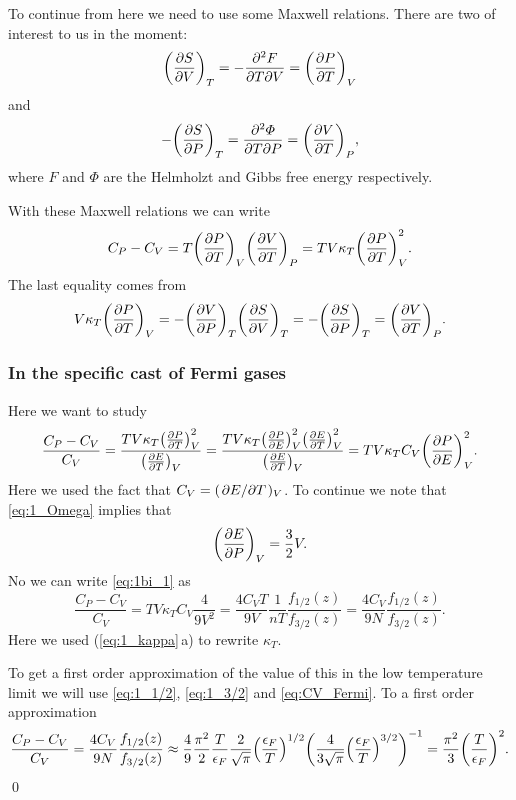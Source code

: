 \documentclass[11pt,letter, swedish, english
]{article}
\begin{document}
To continue from here we need to use some Maxwell relations. There are
two of interest to us in the moment:
\begin{equation}
\qty(\pdv{S}{V})_T=-\pdv[2]{F}{T}{V}=\qty(\pdv{P}{T})_V
\end{equation}
and
\begin{equation}
-\qty(\pdv{S}{P})_T=\pdv[2]{\varPhi}{T}{P}=\qty(\pdv{V}{T})_P,
\end{equation}
where $F$ and $\varPhi$ are the Helmholzt and Gibbs free energy
respectively. 

With these Maxwell relations we can write
\begin{equation}
C_P-C_V=T\qty(\pdv{P}{T})_V\qty(\pdv{V}{T})_P
=TV\kappa_T\qty(\pdv{P}{T})_V^2.
\end{equation}
The last equality comes from
\begin{equation}
V\kappa_T\qty(\pdv{P}{T})_V=-\qty(\pdv{V}{P})_T\qty(\pdv{S}{V})_T
=-\qty(\pdv{S}{P})_T=\qty(\pdv{V}{T})_P.
\end{equation}

\subsubsection{In the specific cast of Fermi gases}
Here we want to study 
\begin{equation}\label{eq:1bi_1}
\frac{C_P-C_V}{C_V} 
= \frac{TV\kappa_T\qty(\pdv{P}{T})_V^2}{\qty(\pdv{E}{T})_V}
= \frac{TV\kappa_T\qty(\pdv{P}{E})_V^2\qty(\pdv{E}{T})_V^2}{\qty(\pdv{E}{T})_V}
= TV\kappa_TC_V\qty(\pdv{P}{E})_V^2.
\end{equation}
Here we used the fact that $C_V=(\pdv*{E}{T})_V$. To continue we
note that \eqref{eq:1_Omega} implies that
\begin{equation}
\qty(\pdv{E}{P})_V=\frac{3}{2}V.
\end{equation}
No we can write \eqref{eq:1bi_1} as
\begin{equation}
\frac{C_P-C_V}{C_V} 
= TV\kappa_TC_V\frac{4}{9V^2}
=\frac{4C_VT}{9V}\frac{1}{nT}\frac{f_{1/2}(z)}{f_{3/2}(z)}
=\frac{4C_V}{9N}\frac{f_{1/2}(z)}{f_{3/2}(z)}.
\end{equation}
Here we used (\ref{eq:1_kappa}\,a) to rewrite $\kappa_T$.

To get a first order approximation of the value of this in the low
temperature limit we will use \eqref{eq:1_1/2}, \eqref{eq:1_3/2} and
\eqref{eq:CV_Fermi}. To a first order approximation 
\begin{equation}
\frac{C_P-C_V}{C_V} =\frac{4C_V}{9N}\frac{f_{1/2}(z)}{f_{3/2}(z)} 
\approx \frac{4}{9} \frac{\pi^2}{2}\frac{T}{\epsilon_F}
\frac{2}{\sqrt{\pi}}\qty(\frac{\epsilon_F}{T})^{1/2}
\qty(\frac{4}{3\sqrt{\pi}}\qty(\frac{\epsilon_F}{T})^{3/2})^{-1}
=\frac{\pi^2}{3}\qty(\frac{T}{\epsilon_F})^2.
\end{equation}
\qed
\end{document}
